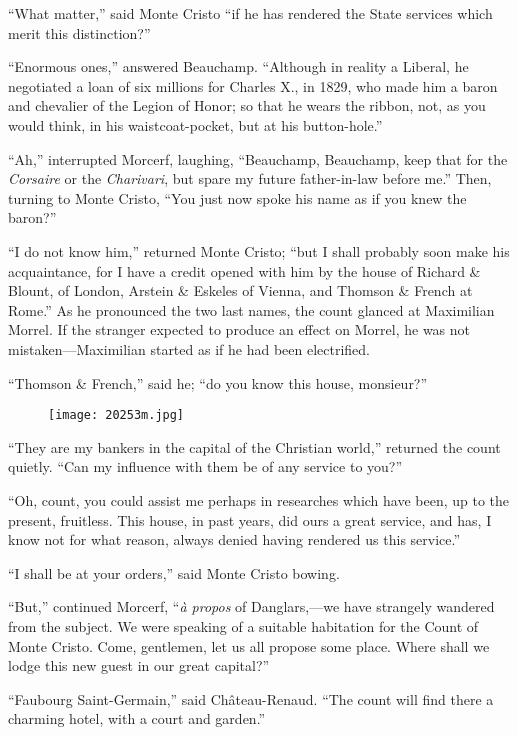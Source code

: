 “What matter,” said Monte Cristo “if he has rendered the State services
which merit this distinction?”

“Enormous ones,” answered Beauchamp. “Although in reality a Liberal, he
negotiated a loan of six millions for Charles X., in 1829, who made him
a baron and chevalier of the Legion of Honor; so that he wears the
ribbon, not, as you would think, in his waistcoat-pocket, but at his
button-hole.”

“Ah,” interrupted Morcerf, laughing, “Beauchamp, Beauchamp, keep that
for the \textit{Corsaire} or the \textit{Charivari}, but spare my future
father-in-law before me.” Then, turning to Monte Cristo, “You just now
spoke his name as if you knew the baron?”

“I do not know him,” returned Monte Cristo; “but I shall probably soon
make his acquaintance, for I have a credit opened with him by the house
of Richard \& Blount, of London, Arstein \& Eskeles of Vienna, and
Thomson \& French at Rome.” As he pronounced the two last names, the
count glanced at Maximilian Morrel. If the stranger expected to produce
an effect on Morrel, he was not mistaken—Maximilian started as if he
had been electrified.

“Thomson \& French,” said he; “do you know this house, monsieur?”

\begin{figure}[ht]
\texttt{[image: 20253m.jpg]}
\end{figure}

“They are my bankers in the capital of the Christian world,” returned
the count quietly. “Can my influence with them be of any service to
you?”

“Oh, count, you could assist me perhaps in researches which have been,
up to the present, fruitless. This house, in past years, did ours a
great service, and has, I know not for what reason, always denied
having rendered us this service.”

“I shall be at your orders,” said Monte Cristo bowing.

“But,” continued Morcerf, “\textit{à propos} of Danglars,—we have strangely
wandered from the subject. We were speaking of a suitable habitation
for the Count of Monte Cristo. Come, gentlemen, let us all propose some
place. Where shall we lodge this new guest in our great capital?”

“Faubourg Saint-Germain,” said Château-Renaud. “The count will find
there a charming hotel, with a court and garden.”

